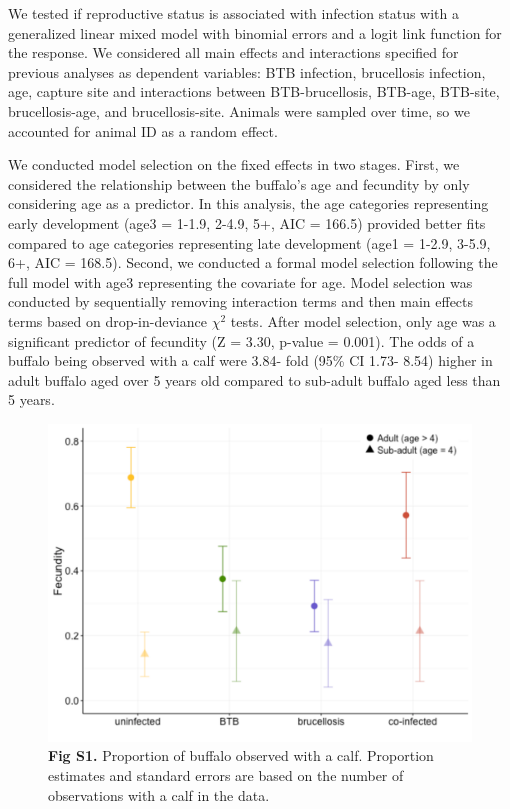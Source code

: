 \documentclass[11pt]{article}
\begin{document}
We tested if reproductive status is associated with infection status with a generalized linear mixed model with binomial errors and a logit link function for the response.  
We considered all main effects and interactions specified for previous analyses as dependent variables: BTB infection, brucellosis infection, age, capture site and interactions between BTB-brucellosis, BTB-age, BTB-site, brucellosis-age, and brucellosis-site. 
Animals were sampled over time, so we accounted for animal ID as a random effect.

We conducted model selection on the fixed effects in two stages.
First, we considered the relationship between the buffalo's age and fecundity by only considering age as a predictor. 
In this analysis, the age categories representing early development (age3 = 1-1.9, 2-4.9, 5+, AIC = 166.5) provided better fits compared to age categories representing late development (age1 = 1-2.9, 3-5.9, 6+, AIC = 168.5). 
Second, we conducted a formal model selection following the full model with age3 representing the covariate for age. 
Model selection was conducted by sequentially removing interaction terms and then main effects terms based on drop-in-deviance $\chi^2$ tests.
After model selection, only age was a significant predictor of fecundity (Z = 3.30, p-value = 0.001).  The odds of a buffalo being observed with a calf were 3.84- fold (95\% CI 1.73- 8.54) higher in adult buffalo aged over 5 years old compared to sub-adult buffalo aged less than 5 years.


\begin{figure}[H]
\centering
\includegraphics[width=.99\linewidth]{Figure_S1.pdf}
\caption*{\textbf{Fig S1.} Proportion of buffalo observed with a calf.  Proportion estimates and standard errors are based on the number of observations with a calf in the data.}
\end{figure}
\end{document}
